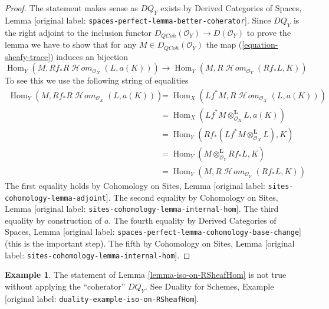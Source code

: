 \documentclass[10pt,a4paper]{article}
\theoremstyle{plain}
\theoremstyle{definition}
\newtheorem{example}[subsection]{Example}
\theoremstyle{remark}
\numberwithin{equation}{subsection}
\def\Hom{\mathop{\mathrm{Hom}}\nolimits}
\def\SheafHom{\mathop{\mathcal{H}\!\mathit{om}}\nolimits}
\def\QCoh{\mathit{QCoh}}
\begin{document}
\begin{proof}
The statement makes sense as $DQ_Y$ exists by
Derived Categories of Spaces, Lemma
\textnormal{[original label: \nolinkurl{spaces-perfect-lemma-better-coherator}]}.
Since $DQ_Y$ is the right adjoint to the inclusion
functor $D_\QCoh(\mathcal{O}_Y) \to D(\mathcal{O}_Y)$
to prove the lemma we have to show that for any
$M \in D_\QCoh(\mathcal{O}_Y)$
the map (\ref{equation-sheafy-trace}) induces an bijection
$$
\Hom_Y(M, Rf_*R\SheafHom_{\mathcal{O}_X}(L, a(K)))
\longrightarrow
\Hom_Y(M, R\SheafHom_{\mathcal{O}_Y}(Rf_*L, K))
$$
To see this we use the following string of equalities
\begin{align*}
\Hom_Y(M, Rf_*R\SheafHom_{\mathcal{O}_X}(L, a(K)))
& =
\Hom_X(Lf^*M, R\SheafHom_{\mathcal{O}_X}(L, a(K))) \\
& =
\Hom_X(Lf^*M \otimes_{\mathcal{O}_X}^\mathbf{L} L, a(K)) \\
& =
\Hom_Y(Rf_*(Lf^*M \otimes_{\mathcal{O}_X}^\mathbf{L} L), K) \\
& =
\Hom_Y(M \otimes_{\mathcal{O}_Y}^\mathbf{L} Rf_*L, K) \\
& =
\Hom_Y(M, R\SheafHom_{\mathcal{O}_Y}(Rf_*L, K))
\end{align*}
The first equality holds by Cohomology on Sites, Lemma
\textnormal{[original label: \nolinkurl{sites-cohomology-lemma-adjoint}]}.
The second equality by Cohomology on Sites, Lemma
\textnormal{[original label: \nolinkurl{sites-cohomology-lemma-internal-hom}]}.
The third equality by construction of $a$.
The fourth equality by Derived Categories of Spaces, Lemma
\textnormal{[original label: \nolinkurl{spaces-perfect-lemma-cohomology-base-change}]} (this is the important step).
The fifth by Cohomology on Sites, Lemma
\textnormal{[original label: \nolinkurl{sites-cohomology-lemma-internal-hom}]}.
\end{proof}

\begin{example}
\label{example-iso-on-RSheafHom}
The statement of Lemma \ref{lemma-iso-on-RSheafHom} is not true without
applying the ``coherator'' $DQ_Y$. See
Duality for Schemes, Example \textnormal{[original label: \nolinkurl{duality-example-iso-on-RSheafHom}]}.
\end{example}
\end{document}
